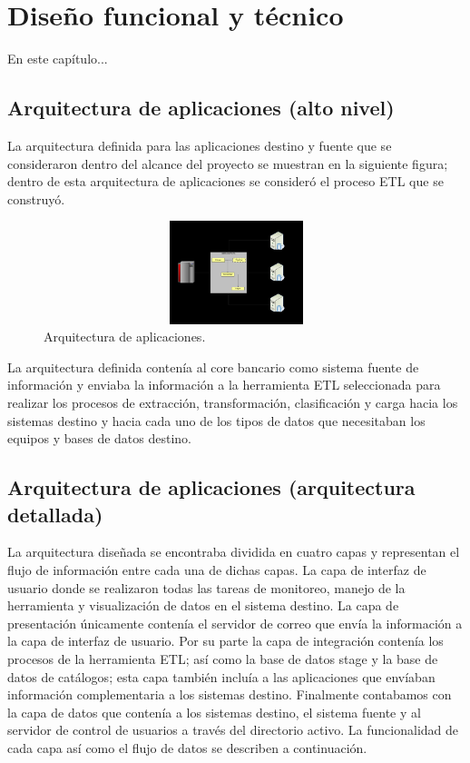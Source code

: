 \chapter{Diseño funcional y técnico}
\label{cap:diseno-funcional}

En este capítulo...

\section{Arquitectura de aplicaciones (alto nivel)}

La arquitectura definida para las aplicaciones destino y fuente que se
consideraron dentro del alcance del proyecto se muestran en la siguiente figura;
dentro de esta arquitectura de aplicaciones se consideró el proceso ETL que se
construyó.

\begin{figure}[htb]
  \begin{center}
    \includegraphics[width=12cm, height=3cm, scale=0.5]{Arquitectura.jpg}
        \caption{Arquitectura de aplicaciones.}
    \label{fig:arquitectura}
  \end{center}
\end{figure}

La arquitectura definida contenía al core bancario como sistema fuente de
información y enviaba la información a la herramienta ETL seleccionada para
realizar los procesos de extracción, transformación, clasificación y carga hacia
los sistemas destino y hacia cada uno de los tipos de datos que necesitaban los
equipos y bases de datos destino.


\section{Arquitectura de aplicaciones (arquitectura detallada)}

La arquitectura diseñada se encontraba dividida en cuatro capas y representan el
flujo de información entre cada una de dichas capas. La capa de interfaz de
usuario donde se realizaron todas las tareas de monitoreo, manejo de la
herramienta y visualización de datos en el sistema destino. La capa de
presentación únicamente contenía el servidor de correo que envía la información
a la capa de interfaz de usuario. Por su parte la capa de integración contenía
los procesos de la herramienta ETL; así como la base de datos stage y la base de
datos de catálogos; esta capa también incluía a las aplicaciones que envíaban
información complementaria a los sistemas destino. Finalmente contabamos con la
capa de datos que contenía a los sistemas destino, el sistema fuente y al
servidor de control de usuarios a través del directorio activo. La funcionalidad
de cada capa así como el flujo de datos se describen a continuación.

